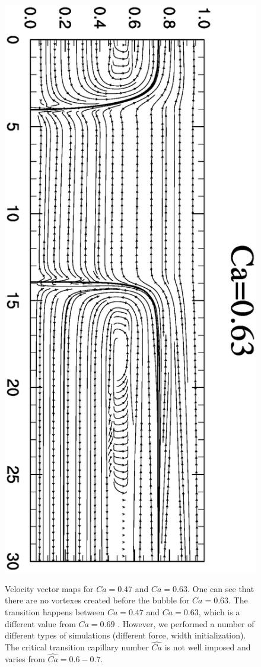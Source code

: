 \documentclass{article}
\begin{document}
\begin{figure}[ht]
\includegraphics[angle=90,width=\textwidth]{Figures/stream_ca63.eps}\\
\caption{Velocity vector maps for $Ca=0.47$ and $Ca=0.63$. One can see that there are no vortexes
created
before the bubble for $Ca=0.63$. The transition happens between $Ca=0.47$ and $Ca=0.63$, which
is a different value from $Ca=0.69$ \cite{heil-threedim}. However, we performed a number of
different types of simulations (different force, width initialization). The critical transition
capillary number $\widehat{Ca}$ is not well imposed and varies from $\widehat{Ca}=0.6-0.7$.
\label{fig:streamlines:pattern}}
\end{figure}
\end{document}
